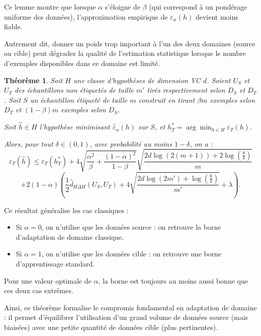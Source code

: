 \documentclass[a4paper,12pt]{article}
\newtheorem{theorem}{Théorème}
\theoremstyle{definition}
\theoremstyle{remark}
\begin{document}
Ce lemme montre que lorsque $\alpha$ s’éloigne de $\beta$ (qui correspond à un
pondérage uniforme des données), l’approximation empirique de $\varepsilon_\alpha(h)$
devient moins fiable.

Autrement dit, donner un poids trop important à l’un des deux domaines (source ou cible)
peut dégrader la qualité de l’estimation statistique lorsque le nombre d’exemples disponibles
dans ce domaine est limité.\\ 

\begin{theorem}
Soit $H$ une classe d’hypothèses de dimension VC $d$. Soient $U_S$ et $U_T$
des échantillons non étiquetés de taille $m'$ tirés respectivement selon $D_S$
et $D_T$. Soit $S$ un échantillon étiqueté de taille $m$ construit en tirant
$\beta m$ exemples selon $D_T$ et $(1-\beta)m$ exemples selon $D_S$.

Soit $\hat{h} \in H$ l’hypothèse minimisant $\hat{\varepsilon}_\alpha(h)$ sur $S$, et
$h_T^* = \arg\min_{h \in H} \varepsilon_T(h)$.

Alors, pour tout $\delta \in (0,1)$, avec probabilité au moins $1-\delta$, on a :
\[
\varepsilon_T(\hat{h}) \leq \varepsilon_T(h_T^*)
+ 4 \sqrt{
\frac{\alpha^2}{\beta} + \frac{(1-\alpha)^2}{1-\beta}
}
\sqrt{
\frac{2d \log(2(m+1)) + 2\log\left(\frac{8}{\delta}\right)}{m}
}
\]
\[
+ 2(1-\alpha)\left(
\frac{1}{2}\hat{d}_{H\Delta H}(U_S, U_T)
+ 4 \sqrt{\frac{2d \log(2m') + \log\left(\frac{8}{\delta}\right)}{m'}}
+ \lambda
\right).
\]
\end{theorem}




Ce résultat généralise les cas classiques :

\begin{itemize}
\item Si $\alpha = 0$, on n’utilise que les données source : on retrouve la borne
d’adaptation de domaine classique.
\item Si $\alpha = 1$, on n’utilise que les données cible : on retrouve une borne
d’apprentissage standard.
\end{itemize}

Pour une valeur optimale de $\alpha$, la borne est toujours au moins aussi bonne que ces deux cas extrêmes.

Ainsi, ce théorème formalise le compromis fondamental en adaptation de domaine :
il permet d’équilibrer l’utilisation d’un grand volume de données source (mais biaisées)
avec une petite quantité de données cible (plus pertinentes).
\end{document}
